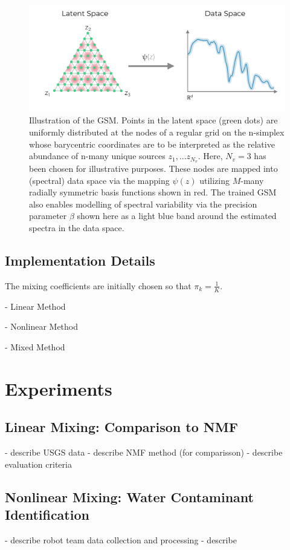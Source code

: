 \documentclass[remotesensing,article,submit,pdftex,moreauthors]{Definitions/mdpi}
\begin{document}
\begin{figure}[H]
\includegraphics[width=\columnwidth]{paper/figures/methods/gsm/gsm-diagram.pdf}
\caption{Illustration of the GSM. Points in the latent space (green dots) are uniformly distributed at the nodes of a regular grid on the n-simplex whose barycentric coordinates are to be interpreted as the relative abundance of n-many unique sources $z_1, ... z_{N_v}$. Here, $N_v=3$ has been chosen for illustrative purposes. These nodes are mapped into (spectral) data space via the mapping $\psi(z)$ utilizing $M$-many radially symmetric basis functions shown in red. The trained GSM also enables modelling of spectral variability via the precision parameter $\beta$ shown here as a light blue band around the estimated spectra in the data space.\label{fig:gsm-diagram}}
\end{figure}  


\subsection{Implementation Details}

The mixing coefficients are initially chosen so that $\pi_k = \frac{1}{K}$.

- Linear Method

- Nonlinear Method

- Mixed Method


\section{Experiments}
\subsection{Linear Mixing: Comparison to NMF}
- describe USGS data
- describe NMF method (for comparisson)
- describe evaluation criteria

\subsection{Nonlinear Mixing: Water Contaminant Identification}
- describe robot team data collection and processing
- describe 
\end{document}
